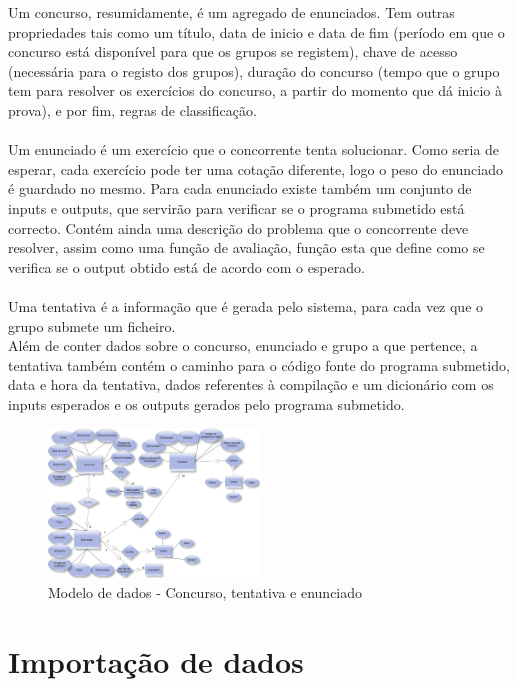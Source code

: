 Um concurso, resumidamente, é um agregado de enunciados. 
Tem outras propriedades tais como um título, data de inicio e data de fim (período em que o concurso está disponível para que os grupos se registem), 
chave de acesso (necessária para o registo dos grupos), duração do concurso (tempo que o grupo tem para resolver os exercícios do concurso, 
a partir do momento que dá inicio à prova), e por fim, regras de classificação.\\
\\
Um enunciado é um exercício que o concorrente tenta solucionar. Como seria de esperar, cada exercício pode ter uma cotação diferente, 
logo o peso do enunciado é guardado no mesmo. 
Para cada enunciado existe também um conjunto de inputs e outputs, que servirão para verificar se o programa submetido está correcto. 
Contém ainda uma descrição do problema que o concorrente deve resolver, assim como uma função de avaliação, função esta que define como
 se verifica se o output obtido está de acordo com o esperado.\\
\\
Uma tentativa é a informação que é gerada pelo sistema, para cada vez que o grupo submete um ficheiro.\\
Além de conter dados sobre o concurso, enunciado e grupo a que pertence, a tentativa também contém o caminho para o código fonte do programa
submetido, data e hora da tentativa, dados referentes à compilação e um dicionário com os inputs esperados e os outputs gerados pelo programa
submetido.
\begin{figure}[htbp]
\begin{center}
\includegraphics[width=0.5\textwidth]{Images/concurso-enunciado}
\caption{Modelo de dados - Concurso, tentativa e enunciado}\label{fig modedados-conc-enunc}
\end{center}
\end{figure}

\section{Importação de dados}\label{sec xml}

